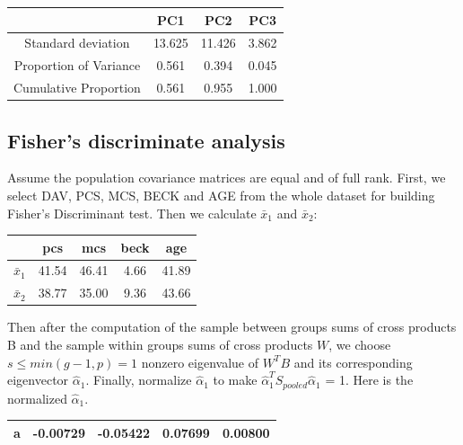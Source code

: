 \documentclass{article}
\begin{document}
      \begin{center}
        \begin{tabular}{c c c c}
          \hline
          &PC1 &   PC2   &PC3\\
          \hline
          Standard deviation &    13.625& 11.426& 3.862\\
          Proportion of Variance & 0.561&  0.394& 0.045\\
          Cumulative Proportion&   0.561&  0.955& 1.000\\
          \hline
        \end{tabular}
      \end{center}

    \subsection{Fisher's discriminate analysis}
      Assume the population covariance matrices are equal and of full rank. First, we select DAV, PCS, MCS, BECK and AGE from the whole dataset for building Fisher's Discriminant test. Then we calculate $\bar x_1$ and $\bar x_2$:

      \begin{center}
        \begin{tabular}{c c c c c}
          \hline
          &pcs  & mcs&  beck&   age\\
          \hline
          $\bar x_1$ & 41.54 &46.41 & 4.66 &41.89\\
          $\bar x_2$ & 38.77 &35.00 & 9.36 &43.66\\
          \hline
        \end{tabular}
      \end{center}

      Then after the computation of the sample between groups sums of cross products B and the sample within groups sums of cross products $W$, we choose $s \leq min(g-1,p) = 1$ nonzero eigenvalue of $W^T B$ and its corresponding eigenvector $\hat \alpha_1$. Finally, normalize $\hat \alpha_1$ to make $\hat \alpha_1^T S_{pooled} \hat \alpha_1$ = 1. Here is the normalized $\hat \alpha_1$.

      \begin{center}
        \begin{tabular}{c c c c c}
          \hline
          a & -0.00729 &-0.05422 & 0.07699 & 0.00800\\
          \hline
        \end{tabular}
      \end{center}
\end{document}
